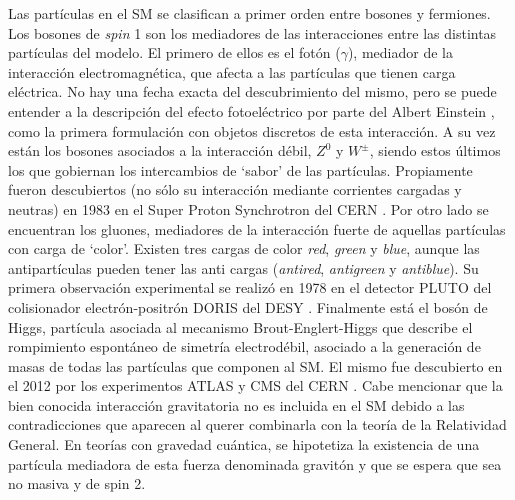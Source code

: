 Las partículas en el SM se clasifican a primer orden entre bosones y fermiones. Los bosones de \textit{spin} 1 son los mediadores de las interacciones entre las distintas partículas del modelo. El primero de ellos es el fotón ($\gamma$), mediador de la interacción electromagnética, que afecta a las partículas que tienen carga eléctrica. No hay una fecha exacta del descubrimiento del mismo, pero se puede entender a la descripción del efecto fotoeléctrico por parte del Albert Einstein \cite{einstein}, como la primera formulación con objetos discretos de esta interacción. A su vez están los bosones asociados a la interacción débil, $Z^0$ y $W^\pm$, siendo estos últimos los que gobiernan los intercambios de `sabor' de las partículas. Propiamente fueron descubiertos (no sólo su interacción mediante corrientes cargadas y neutras) en 1983 en el Super Proton Synchrotron del CERN \cite{DiLella:2015yit}. Por otro lado se encuentran los gluones, mediadores de la interacción fuerte de aquellas partículas con carga de `color'. Existen tres cargas de color \textit{red}, \textit{green} y \textit{blue}, aunque las antipartículas pueden tener las anti cargas (\textit{antired}, \textit{antigreen} y \textit{antiblue}). Su primera observación experimental se realizó en 1978 en el detector PLUTO del colisionador electrón-positrón DORIS del DESY \cite{gluon}. Finalmente está el bosón de Higgs, partícula asociada al mecanismo Brout-Englert-Higgs que describe el rompimiento espontáneo de simetría electrodébil, asociado a la generación de masas de todas las partículas que componen al SM. El mismo fue descubierto en el 2012 por los experimentos ATLAS y CMS del CERN \cite{higgs_atlas, higgs_cms}. Cabe mencionar que la bien conocida interacción gravitatoria no es incluida en el SM debido a las contradicciones que aparecen al querer combinarla con la teoría de la Relatividad General. En teorías con gravedad cuántica, se hipotetiza la existencia de una partícula mediadora de esta fuerza denominada gravitón y que se espera que sea no masiva y de spin 2.


